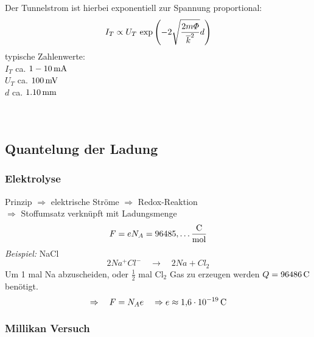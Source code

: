 Der Tunnelstrom ist hierbei exponentiell zur Spannung proportional:
\begin{equation*}
I_T \propto U_T \textrm{ exp}\left(- 2\sqrt{\frac{2 m \varPhi}{\overline{k}^2}} d \right)
\end{equation*}
typische Zahlenwerte:\\
$ I_T $ ca. $ 1 - 10 \, \textrm{mA} $\\
$ U_T $ ca. $ 100 \, \textrm{mV} $\\
$ d $ ca. $ 1 . 10 \, \textrm{mm} $\\
\\
\\


\subsection{Quantelung der Ladung}

\subsubsection{Elektrolyse}


Prinzip $ \Rightarrow $ elektrische Ströme $ \Rightarrow $ Redox-Reaktion\\
$ \Rightarrow $ Stoffumsatz verknüpft mit Ladungsmenge
\begin{equation*}
F = e N_A = 96485{,}\dots \frac{\textrm{C}}{\textrm{mol}}
\end{equation*}
\emph{Beispiel:} NaCl
\begin{equation*}
2 Na^+ Cl^- \quad \rightarrow \quad 2 Na + Cl_2
\end{equation*}
Um 1 mal Na abzuscheiden, oder $ \frac{1}{2} $ mal Cl$ _2 $ Gas zu erzeugen werden $ Q = 96486 \, \textrm{C} $ benötigt.
\begin{equation*}
\Rightarrow \quad F = N_A e \quad \Rightarrow e \approx 1{,}6 \cdot 10^{-19} \, \textrm{C} 
\end{equation*}

\subsubsection{Millikan Versuch}


